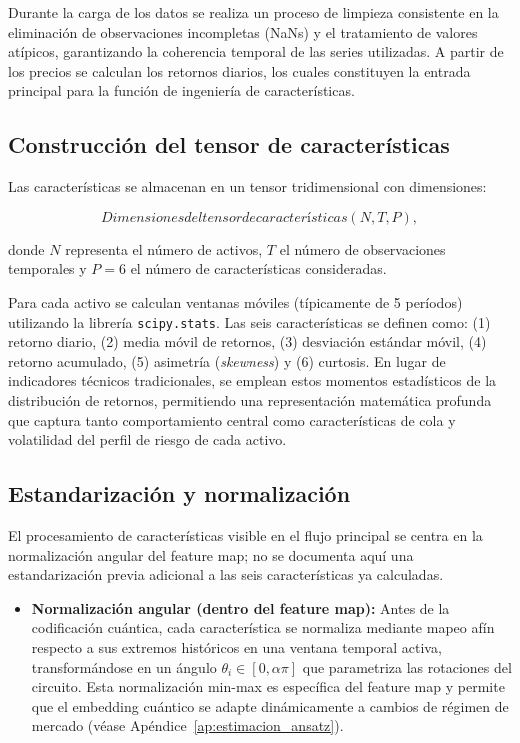 Durante la carga de los datos se realiza un proceso de limpieza consistente en la eliminación de observaciones incompletas (NaNs) y el tratamiento de valores atípicos, garantizando la coherencia temporal de las series utilizadas. A partir de los precios se calculan los retornos diarios, los cuales constituyen la entrada principal para la función de ingeniería de características.

\subsection{Construcción del tensor de características}
\label{sec:construccion_tensor}

Las características se almacenan en un tensor tridimensional con dimensiones:

\begin{equation}[eq:dimensiones_tensor]{Dimensiones del tensor de características}
(N, T, P),
\end{equation}

donde $N$ representa el número de activos, $T$ el número de observaciones temporales y $P=6$ el número de características consideradas. 

Para cada activo se calculan ventanas móviles (típicamente de 5 períodos) utilizando la librería \texttt{scipy.stats}. Las seis características se definen como: (1) retorno diario, (2) media móvil de retornos, (3) desviación estándar móvil, (4) retorno acumulado, (5) asimetría (\textit{skewness}) y (6) curtosis. En lugar de indicadores técnicos tradicionales, se emplean estos momentos estadísticos de la distribución de retornos, permitiendo una representación matemática profunda que captura tanto comportamiento central como características de cola y volatilidad del perfil de riesgo de cada activo.

\subsection{Estandarización y normalización}
\label{sec:estandarizacion_control}

El procesamiento de características visible en el flujo principal se centra en la normalización angular del feature map; no se documenta aquí una estandarización previa adicional a las seis características ya calculadas.

\begin{itemize}
\item \textbf{Normalización angular (dentro del feature map):} Antes de la codificación cuántica, cada característica se normaliza mediante mapeo afín respecto a sus extremos históricos en una ventana temporal activa, transformándose en un ángulo $\theta_i \in [0, \alpha\pi]$ que parametriza las rotaciones del circuito. Esta normalización min-max es específica del feature map y permite que el embedding cuántico se adapte dinámicamente a cambios de régimen de mercado (véase Apéndice~\ref{ap:estimacion_ansatz}).
\end{itemize}

